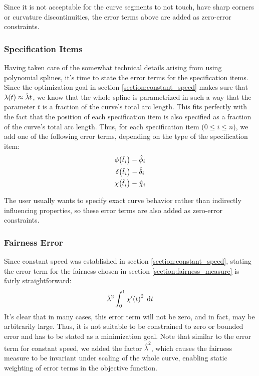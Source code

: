 \documentclass[a4paper]{article}
\begin{document}
				Since it is not acceptable for the curve segments to not touch, have sharp corners or curvature discontinuities, the error terms above are added as zero-error constraints.

			\subsubsection{Specification Items}
			\label{section:specification_items}

				Having taken care of the somewhat technical details arising from using polynomial splines, it's time to state the error terms for the specification items. Since the optimization goal in section \ref{section:constant_speed} makes sure that \(\lambda\!\left( t \right) \approx \hat{\lambda}t\), we know that the whole spline is parametrized in such a way that the parameter \(t\) is a fraction of the curve's total arc length. This fits perfectly with the fact that the position of each specification item is also specified as a fraction of the curve's total arc length. Thus, for each specification item (\(0 \leq i \leq n\)), we add one of the following error terms, depending on the type of the specification item:
				\begin{equation*}
					\begin{gathered}
						\phi\!\left( \hat{t}_i \right) - \hat{\phi}_i\\
						\delta\!\left( \hat{t}_i \right) - \hat{\delta}_i\\
						\chi\!\left( \hat{t}_i \right) - \hat{\chi}_i
					\end{gathered}
				\end{equation*}

				The user usually wants to specify exact curve behavior rather than indirectly influencing properties, so these error terms are also added as zero-error constraints.

			\subsubsection{Fairness Error}
			\label{section:fairness_error}

				Since constant speed was established in section \ref{section:constant_speed}, stating the error term for the fairness chosen in section \ref{section:fairness_measure} is fairly straightforward:
				\begin{equation*}
					\hat{\lambda}^2\int_{0}^{1} \chi'\!\left( t \right)^2 \; \mathrm{d}t
				\end{equation*}
				It's clear that in many cases, this error term will not be zero, and in fact, may be arbitrarily large. Thus, it is not suitable to be constrained to zero or bounded error and has to be stated as a minimization goal. Note that similar to the error term for constant speed, we added the factor \(\hat{\lambda}^2\), which causes the fairness measure to be invariant under scaling of the whole curve, enabling static weighting of error terms in the objective function.
\end{document}
